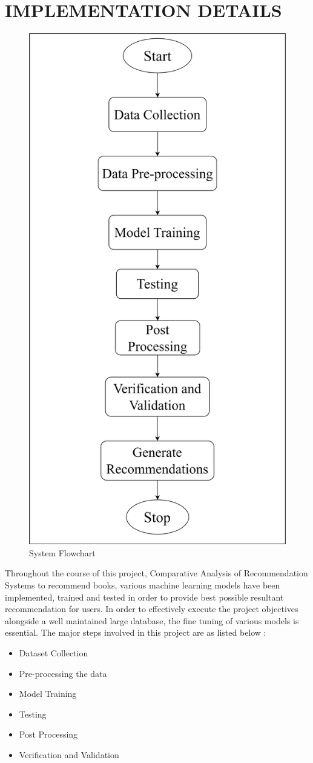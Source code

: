 \chapter{IMPLEMENTATION DETAILS}
\vspace{0.5in}
\begin{figure}[h]
    \centering
    \includegraphics[width=0.6\linewidth]{img/Graphics/System_flow_BRS.drawio.png}
    \caption{System Flowchart}
    \label{Flowchart}
\end{figure}

Throughout the course of this project, Comparative Analysis of Recommendation Systems to recommend books, various machine learning models have been implemented, trained and tested in order to provide best possible resultant recommendation for users. In order to effectively execute the project objectives alongside a well maintained large database, the fine tuning of various models is essential. The major steps involved in this project are as listed below :
\begin{itemize}
    \item Dataset Collection
    \item Pre-processing the data
    \item Model Training
    \item Testing
    \item Post Processing
    \item Verification and Validation
\end{itemize}

